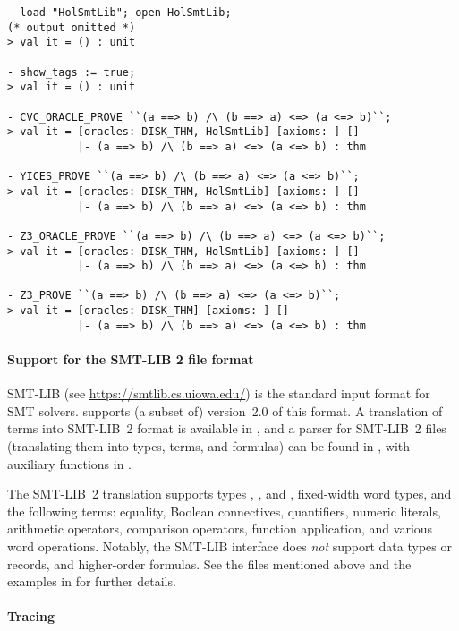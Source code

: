 \begin{session}
\begin{verbatim}
- load "HolSmtLib"; open HolSmtLib;
(* output omitted *)
> val it = () : unit

- show_tags := true;
> val it = () : unit

- CVC_ORACLE_PROVE ``(a ==> b) /\ (b ==> a) <=> (a <=> b)``;
> val it = [oracles: DISK_THM, HolSmtLib] [axioms: ] []
           |- (a ==> b) /\ (b ==> a) <=> (a <=> b) : thm

- YICES_PROVE ``(a ==> b) /\ (b ==> a) <=> (a <=> b)``;
> val it = [oracles: DISK_THM, HolSmtLib] [axioms: ] []
           |- (a ==> b) /\ (b ==> a) <=> (a <=> b) : thm

- Z3_ORACLE_PROVE ``(a ==> b) /\ (b ==> a) <=> (a <=> b)``;
> val it = [oracles: DISK_THM, HolSmtLib] [axioms: ] []
           |- (a ==> b) /\ (b ==> a) <=> (a <=> b) : thm

- Z3_PROVE ``(a ==> b) /\ (b ==> a) <=> (a <=> b)``;
> val it = [oracles: DISK_THM] [axioms: ] []
           |- (a ==> b) /\ (b ==> a) <=> (a <=> b) : thm
\end{verbatim}
\end{session}

\paragraph{Support for the SMT-LIB 2 file format}

SMT-LIB (see \url{https://smtlib.cs.uiowa.edu/}) is the standard input
format for SMT solvers.   supports (a subset of)
version~2.0 of this format.  A translation of \HOL{} terms into
SMT-LIB~2 format is available in , and a parser for
SMT-LIB~2 files (translating them into \HOL{} types, terms, and
formulas) can be found in , with auxiliary
functions in .

The SMT-LIB~2 translation supports types , ,
 and , fixed-width word types, and the
following terms: equality, Boolean connectives, quantifiers, numeric
literals, arithmetic operators, comparison operators, function
application, and various word operations.  Notably, the SMT-LIB
interface does \emph{not} support data types or records, and
higher-order formulas.  See the files mentioned above and the examples
in  for further details.

\paragraph{Tracing}

